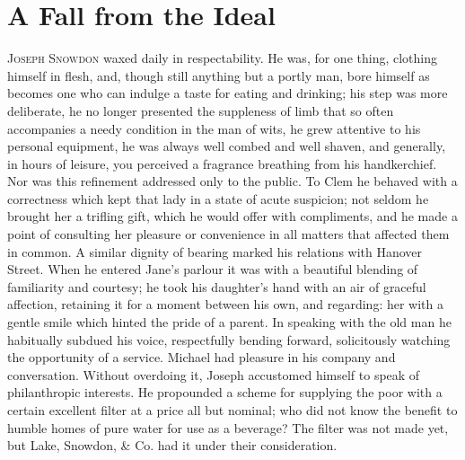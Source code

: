 \chapter{A Fall from the Ideal}

\textsc{Joseph Snowdon} waxed daily in respectability. He was, for one
thing, clothing himself in flesh, and, though still anything but a
portly man, bore himself as becomes one who can indulge a taste for
eating and drinking; his step was more deliberate, he no longer
presented the suppleness of limb that so often accompanies a needy
condition in the man of wits, he grew attentive to his personal
equipment, he was always well combed and well shaven, and generally, in
hours of leisure, you perceived a fragrance breathing from his
handkerchief. Nor was this refinement addressed only to the public. To
Clem he behaved with a correctness which kept that lady in a state of
acute suspicion; not seldom he brought her a trifling gift, which he
would offer with compliments, and he made a point of consulting her
{}pleasure or convenience in all matters that affected them in common. A
similar dignity of bearing marked his relations with Hanover Street.
When he entered Jane's parlour it was with a beautiful blending of
familiarity and courtesy; he took his daughter's hand with an air of
graceful affection, retaining it for a moment between his own, and
regarding: her with a gentle smile which hinted the pride of a parent.
In speaking with the old man he habitually subdued his voice,
respectfully bending forward, solicitously watching the opportunity of a
service. Michael had pleasure in his company and conversation. Without
overdoing it, Joseph accustomed himself to speak of philanthropic
interests. He propounded a scheme for supplying the poor with a certain
excellent filter at a price all but nominal; who did not know the
benefit to humble homes of pure water for use as a beverage? The filter
was not made yet, but Lake, Snowdon, \& Co. had it under their
consideration.

